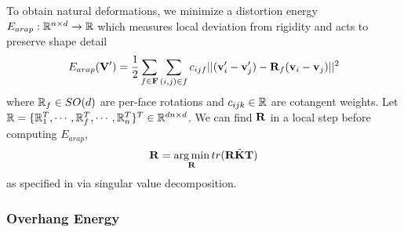 To obtain natural deformations, we minimize a distortion energy $E_{arap}:  \mathbb{R}^{n \times d} \to \mathbb{R}$ which measures local deviation from rigidity and acts to preserve shape detail~\cite{sorkine_arap_2007}
\[
    E_{arap}(\mathbf{V}') = \frac{1}{2} \sum_{f\in \mathbf{F}} \sum_{(i,j)\in f} c_{ijf} || (\mathbf{v}_i' - \mathbf{v}_j') - \mathbf{R}_f(\mathbf{v}_i - \mathbf{v}_j) ||^2
\]
where $\mathbb{R}_f \in SO(d)$ are per-face rotations and $c_{ijk}\in \mathbb{R}$ are cotangent weights. Let $\mathbb{R} = \{\mathbb{R}_1^T, \cdots, \mathbb{R}_f^T, \cdots, \mathbb{R}_n^T \}^T \in \mathbb{R}^{dn \times d}$. We can find $\mathbf{R}$ in a local step before computing $E_{arap}$,
\[
    \mathbf{R} = \operatorname*{arg\,min}_{\mathbf{R}} tr(\mathbf{R}\tilde{\mathbf{K}}\mathbf{T})
\]
as specified in \cite{jacobson_fast_2012} via singular value decomposition.

    

\subsubsection*{Overhang Energy}

